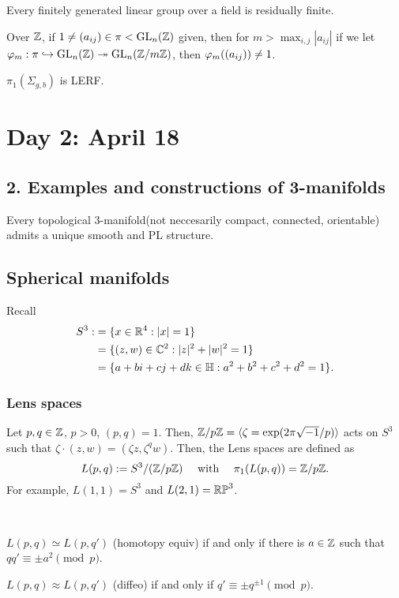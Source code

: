 \documentclass{../../small}
\begin{document}
\begin{thm}
Every finitely generated linear group over a field is residually finite.
\end{thm}

Over $\mathbb{Z}$, if $1\ne(a_{ij})\in\pi<\mathrm{GL}_n(\mathbb{Z})$ given, then for $m>\max_{i,j}|a_{ij}|$ if we let $\varphi_m:\pi\hookrightarrow\mathrm{GL}_n(\mathbb{Z})\twoheadrightarrow\mathrm{GL}_n(\mathbb{Z}/m\mathbb{Z})$, then $\varphi_m((a_{ij}))\ne1$.

\begin{thm}[Scott]
$\pi_1(\Sigma_{g,b})$ is LERF.
\end{thm}


\section{Day 2: April 18}

\subsection*{2. Examples and constructions of 3-manifolds}

\begin{thm}[Moise]
Every topological 3-manifold(not neccesarily compact, connected, orientable) admits a unique smooth and PL structure.
\end{thm}

\subsection{Spherical manifolds}

Recall
\begin{align*}
S^3:&=\{x\in\mathbb{R}^4:|x|=1\}\\
&=\{(z,w)\in\mathbb{C}^2:|z|^2+|w|^2=1\}\\
&=\{a+bi+cj+dk\in\mathbb{H}:a^2+b^2+c^2+d^2=1\}.
\end{align*}
\subsubsection*{Lens spaces}
Let $p,q\in\mathbb{Z}$, $p>0$, $(p,q)=1$.
Then, $\mathbb{Z}/p\mathbb{Z}=\langle\zeta=\exp(2\pi\sqrt{-1}/p)\rangle$ acts on $S^3$ such that $\zeta\cdot(z,w)=(\zeta z,\zeta^qw)$.
Then, the Lens spaces are defined as
\[L(p,q):=S^3/(\mathbb{Z}/p\mathbb{Z})\quad\text{ with }\quad\pi_1(L(p,q))=\mathbb{Z}/p\mathbb{Z}.\]
For example, $L(1,1)=S^3$ and $L(2,1)=\mathbb{RP}^3$.


\begin{thm}[Reidemeister]\,
\begin{parts}
\item $L(p,q)\simeq L(p,q')$ (homotopy equiv) if and only if there is $a\in\mathbb{Z}$ such that $qq'\equiv\pm a^2\pmod p$.
\item $L(p,q)\approx L(p,q')$ (diffeo) if and only if $q'\equiv\pm q^{\pm1}\pmod p$.
\end{parts}
\end{thm}
\end{document}
